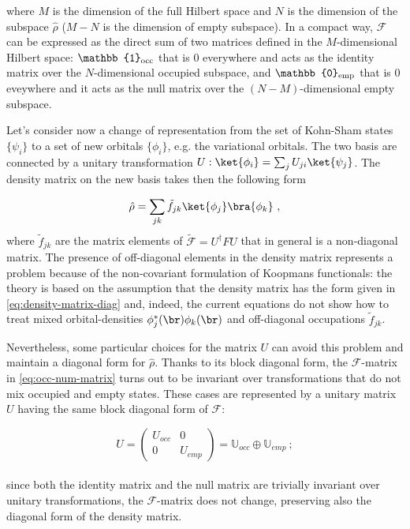 %
where $M$ is the dimension of the full Hilbert space and $N$ is the dimension of the subspace $\hat{\rho}$ ($M-N$ is the dimension of empty subspace). In a compact way, $\mathcal{F}$ can be expressed as the direct sum of two matrices defined in the $M$-dimensional Hilbert space: $\mathbb{1}_{\rm occ}$ that is 0 everywhere and acts as the identity matrix over the $N$-dimensional occupied subspace, and $\mathbb{0}_{\rm emp}$ that is 0 eveywhere and it acts as the null matrix over the 
$(N-M)$-dimensional empty subspace.

Let's consider now a change of representation from the set of Kohn-Sham states $\{ \psi_i \}$ to a set of new orbitals $\{ \phi_i \}$, e.g. the variational orbitals. The two basis are connected by a unitary transformation $U: \ket{\phi_i} = \sum_j U_{ji} \ket{\psi_j}$. The density matrix on the new basis takes then the following form

\begin{equation}
    \hat{\rho} = \sum_{jk} \tilde{f}_{jk} \ket{\phi_j} \bra{\phi_k} \ ,
    \label{eq:density-matrix-off-diag}
\end{equation}
%
where $\tilde{f}_{jk}$ are the matrix elements of $\tilde{\mathcal{F}} = U^{\dagger} F U$ that in general is a non-diagonal matrix. The presence of off-diagonal elements in the density matrix represents a problem because of the non-covariant formulation of Koopmans functionals: the theory is based on the assumption that the density matrix has the form given in \eqref{eq:density-matrix-diag} and, indeed, the current equations do not show how to treat mixed orbital-densities $\phi_j^*(\br) \phi_k(\br)$ and off-diagonal occupations $\tilde{f}_{jk}$.

Nevertheless, some particular choices for the matrix $U$ can avoid this problem and maintain a diagonal form for $\hat{\rho}$. Thanks to its block diagonal form, the $\mathcal{F}$-matrix in \eqref{eq:occ-num-matrix} turns out to be invariant over transformations that do not mix occupied and empty states. These cases are represented by a unitary matrix $U$ having the same block diagonal form of $\mathcal{F}$:

\begin{equation}
    U = 
    \begin{pmatrix}
        U_{occ} & 0 \\
        0 & U_{emp}
    \end{pmatrix}
     = \mathbb{U}_{occ} \oplus \mathbb{U}_{emp} \ ;
     \label{eq:U-matrix-separate}
\end{equation} \\
%
since both the identity matrix and the null matrix are trivially invariant over unitary transformations, the $\mathcal{F}$-matrix does not change, preserving also the diagonal form of the density matrix.

